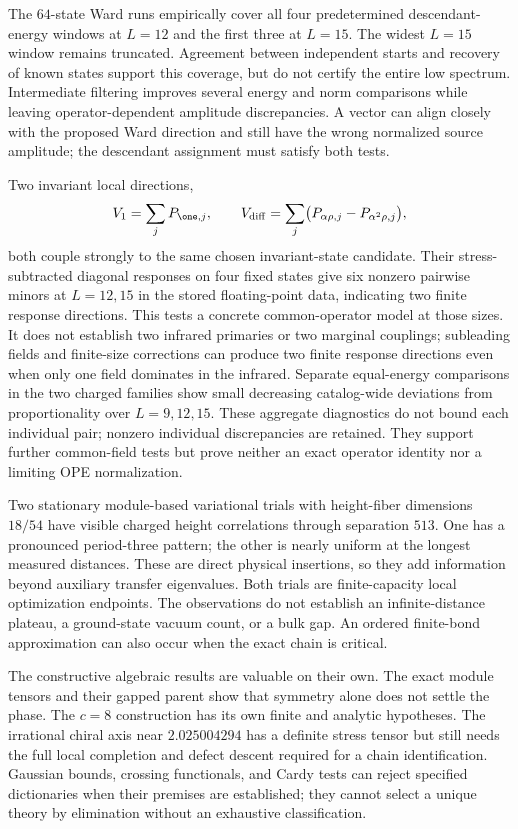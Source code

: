\begin{numericalrecord}
The $64$-state Ward runs empirically cover all four predetermined
descendant-energy windows at $L=12$ and the first three at $L=15$.
The widest $L=15$ window remains truncated. Agreement between
independent starts and recovery of known states support this
coverage, but do not certify the entire low spectrum.
Intermediate filtering improves several energy and norm
comparisons while leaving operator-dependent amplitude
discrepancies. A vector can align closely with the proposed
Ward direction and still have the wrong normalized source
amplitude; the descendant assignment must satisfy both tests.

Two invariant local directions,
\[
 V_1=\sum_jP_{\one,j},\qquad
 V_{\rm diff}=\sum_j\bigl(P_{\alpha\rho,j}-P_{\alpha^2\rho,j}\bigr),
\]
both couple strongly to the same chosen invariant-state candidate.
Their stress-subtracted diagonal responses on four fixed states
give six nonzero pairwise minors at $L=12,15$ in the stored
floating-point data, indicating two finite response directions. This tests a concrete
common-operator model at those sizes. It does not establish two
infrared primaries or two marginal couplings; subleading fields
and finite-size corrections can produce two finite response
directions even when only one field dominates in the infrared.
Separate equal-energy comparisons in the two charged families
show small decreasing catalog-wide deviations from proportionality over
$L=9,12,15$. These aggregate diagnostics do not bound each individual
pair; nonzero individual discrepancies are retained.
They support further common-field tests but prove neither an
exact operator identity nor a limiting OPE normalization.

Two stationary module-based variational trials with height-fiber
dimensions $18/54$ have visible charged height correlations
through separation $513$. One has a pronounced period-three
pattern; the other is nearly uniform at the longest measured
distances. These are direct physical insertions, so they add
information beyond auxiliary transfer eigenvalues. Both trials
are finite-capacity local optimization endpoints. The observations
do not establish an infinite-distance plateau, a ground-state
vacuum count, or a bulk gap. An ordered finite-bond approximation
can also occur when the exact chain is critical.
\end{numericalrecord}

The constructive algebraic results are valuable on their own. The
exact module tensors and their gapped parent show that symmetry
alone does not settle the phase. The $c=8$ construction has its own
finite and analytic hypotheses. The irrational chiral axis near
$2.025004294$ has a definite stress tensor but still needs the
full local completion and defect descent required for a chain
identification. Gaussian bounds, crossing functionals, and Cardy
tests can reject specified dictionaries when their premises are
established; they cannot select a unique theory by elimination
without an exhaustive classification.


